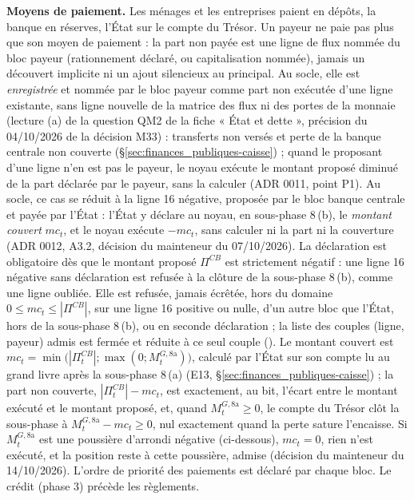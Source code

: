 \documentclass[11pt,a4paper]{article}
\newcommand{\code}[1]{\texttt{\detokenize{#1}}}
\begin{document}
\textbf{Moyens de paiement.} Les ménages et les entreprises paient en dépôts, la banque en réserves, l'État sur le compte du Trésor. Un payeur ne paie pas plus que son moyen de paiement : la part non payée est une ligne de flux nommée du bloc payeur (rationnement déclaré, ou capitalisation nommée), jamais un découvert implicite ni un ajout silencieux au principal. Au socle, elle est \emph{enregistrée} et nommée par le bloc payeur comme part non exécutée d'une ligne existante, sans ligne nouvelle de la matrice des flux ni des portes de la monnaie (lecture (a) de la question QM2 de la fiche « État et dette », précision du 04/10/2026 de la décision M33) : transferts non versés et perte de la banque centrale non couverte (\S\ref{sec:finances_publiques-caisse}) ; quand le proposant d'une ligne n'en est pas le payeur, le noyau exécute le montant proposé diminué de la part déclarée par le payeur, sans la calculer (ADR 0011, point P1). Au socle, ce cas se réduit à la ligne 16 négative, proposée par le bloc banque centrale et payée par l'État : l'État y déclare au noyau, en sous-phase 8\,(b), le \emph{montant couvert} $\mathit{mc}_t$, et le noyau exécute $-\mathit{mc}_t$, sans calculer ni la part ni la couverture (ADR 0012, A3.2, décision du mainteneur du 07/10/2026). La déclaration est obligatoire dès que le montant proposé $\Pi^{\mathit{CB}}$ est strictement négatif : une ligne 16 négative sans déclaration est refusée à la clôture de la sous-phase 8\,(b), comme une ligne oubliée. Elle est refusée, jamais écrêtée, hors du domaine $0 \le \mathit{mc}_t \le |\Pi^{\mathit{CB}}|$, sur une ligne 16 positive ou nulle, d'un autre bloc que l'État, hors de la sous-phase 8\,(b), ou en seconde déclaration ; la liste des couples (ligne, payeur) admis est fermée et réduite à ce seul couple (\code{nations.noyau.catalogue.COUPLES_MONTANT_COUVERT}). Le montant couvert est $\mathit{mc}_t = \min\bigl(|\Pi^{\mathit{CB}}_t| ; \max(0 ; M^{G,8\mathrm{a}}_t)\bigr)$, calculé par l'État sur son compte lu au grand livre après la sous-phase 8\,(a) (E13, \S\ref{sec:finances_publiques-caisse}) ; la part non couverte, $|\Pi^{\mathit{CB}}_t| - \mathit{mc}_t$, est exactement, au bit, l'écart entre le montant exécuté et le montant proposé, et, quand $M^{G,8\mathrm{a}}_t \ge 0$, le compte du Trésor clôt la sous-phase à $M^{G,8\mathrm{a}}_t - \mathit{mc}_t \ge 0$, nul exactement quand la perte sature l'encaisse. Si $M^{G,8\mathrm{a}}_t$ est une poussière d'arrondi négative (ci-dessous), $\mathit{mc}_t = 0$, rien n'est exécuté, et la position reste à cette poussière, admise (décision du mainteneur du 14/10/2026). L'ordre de priorité des paiements est déclaré par chaque bloc. Le crédit (phase 3) précède les règlements.
\end{document}
